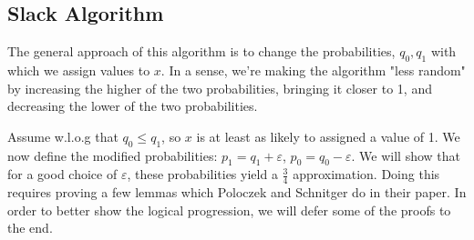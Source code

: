 \documentclass[11pt,letter]{article}
\begin{document}
\subsection{Slack Algorithm}
The general approach of this algorithm is to change the probabilities, $q_0, q_1$ with which we assign values to $x$. In a sense, we're making the algorithm "less random" by increasing the higher of the two probabilities, bringing it closer to 1, and decreasing the lower of the two probabilities.

Assume w.l.o.g that $q_0 \le q_1$, so $x$ is at least as likely to assigned a value of 1. We now define the modified probabilities: $p_1 = q_1 + \varepsilon$, $p_0 = q_0 - \varepsilon$. We will show that for a good choice of $\varepsilon$, these probabilities yield a $\frac{3}{4}$ approximation. Doing this requires proving a few lemmas which Poloczek and Schnitger do in their paper. In order to better show the logical progression, we will defer some of the proofs to the end.
\end{document}
